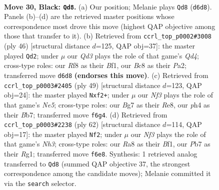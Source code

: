 \documentclass[11pt]{article}
\begin{document}
\clearpage

\begin{figure}[p]\centering
\begin{subfigure}{0.46\textwidth}\centering
\resizebox{\linewidth}{!}{%
\newchessgame
\chessboard[
  setfen={r1b2r2/pp3pbk/n2qpnp1/P2p2Bp/B2P3P/1P4P1/R1PNQP2/1N2R1K1 b - - 0 30},
  showmover=false,
  pgfstyle=straightmove, color=movearrow, markmove={d6-d8}
]}
\caption{}
\end{subfigure}\hfill
\begin{subfigure}{0.46\textwidth}\centering
\resizebox{\linewidth}{!}{%
\newchessgame
\chessboard[
  setfen={1r2r1k1/1b3pp1/pp1pp1n1/6qn/2PQP1Np/2N1RP2/PPR3PP/5BK1 w - - 3 24},
  showmover=false,
  pgfstyle=straightmove, color=movearrow, markmove={d4-d2}
]}
\caption{}
\end{subfigure}
\\[4pt]
\begin{subfigure}{0.46\textwidth}\centering
\resizebox{\linewidth}{!}{%
\newchessgame
\chessboard[
  setfen={2r1r3/1bq2pkp/p3p1p1/P1npP3/1p1NnP2/5Q2/1PP1BBPP/R2R3K b - - 0 25},
  showmover=false,
  pgfstyle=straightmove, color=movearrow, markmove={e4-f2}
]}
\caption{}
\end{subfigure}\hfill
\begin{subfigure}{0.46\textwidth}\centering
\resizebox{\linewidth}{!}{%
\newchessgame
\chessboard[
  setfen={4n1rk/2p2r1p/1p1p1bn1/pP1P1p1q/2P1pP2/1P2B1PN/2Q4P/4RBRK w - - 5 32},
  showmover=false,
  pgfstyle=straightmove, color=movearrow, markmove={h3-f2}
]}
\caption{}
\end{subfigure}
\caption{\textbf{Move 30, Black: \texttt{Qd8}.} (a) Our position; Melanie plays \texttt{Qd8} (\texttt{d6d8}). Panels (b)--(d) are the retrieved master positions whose correspondence most drove this move (highest QAP objective among those that transfer to it). (b) Retrieved from \texttt{ccrl\_top\_p0002\#3008} (ply 46) [structural distance $d$=125, QAP obj=37]: the master played \texttt{Qd2}; under $\mu$ our \emph{Qd3} plays the role of that game's \emph{Qd4}; cross-type roles: our \emph{R}f8 as their \emph{B}f1, our \emph{B}c8 as their \emph{P}a2; transferred move \texttt{d6d8} \textbf{(endorses this move)}. (c) Retrieved from \texttt{ccrl\_top\_p0003\#2405} (ply 49) [structural distance $d$=123, QAP obj=24]: the master played \texttt{Nxf2+}; under $\mu$ our \emph{Nf3} plays the role of that game's \emph{Ne5}; cross-type roles: our \emph{B}g7 as their \emph{R}e8, our \emph{p}h4 as their \emph{B}b7; transferred move \texttt{f6g4}. (d) Retrieved from \texttt{ccrl\_top\_p0003\#2238} (ply 62) [structural distance $d$=114, QAP obj=17]: the master played \texttt{Nf2}; under $\mu$ our \emph{Nf3} plays the role of that game's \emph{Nh3}; cross-type roles: our \emph{R}a8 as their \emph{B}f1, our \emph{P}b7 as their \emph{R}g1; transferred move \texttt{f6e8}. Synthesis: 1 retrieved analog transferred to \texttt{Qd8} (summed QAP objective 37, the strongest correspondence among the candidate moves); Melanie committed it via the \texttt{search} selector.}
\label{fig:thought-m59}
\end{figure}
\end{document}
